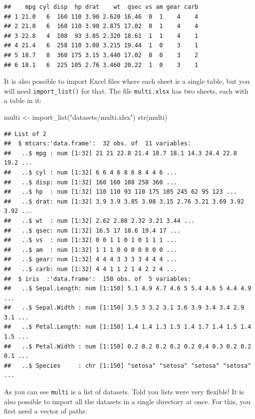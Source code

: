 \documentclass[
]{article}
\newenvironment{Shaded}{\begin{snugshade}}{\end{snugshade}}
\newcommand{\FunctionTok}[1]{\textcolor[rgb]{0.00,0.00,0.00}{#1}}
\newcommand{\NormalTok}[1]{#1}
\newcommand{\OtherTok}[1]{\textcolor[rgb]{0.56,0.35,0.01}{#1}}
\newcommand{\StringTok}[1]{\textcolor[rgb]{0.31,0.60,0.02}{#1}}
\begin{document}
\begin{verbatim}
##    mpg cyl disp  hp drat    wt  qsec vs am gear carb
## 1 21.0   6  160 110 3.90 2.620 16.46  0  1    4    4
## 2 21.0   6  160 110 3.90 2.875 17.02  0  1    4    4
## 3 22.8   4  108  93 3.85 2.320 18.61  1  1    4    1
## 4 21.4   6  258 110 3.08 3.215 19.44  1  0    3    1
## 5 18.7   8  360 175 3.15 3.440 17.02  0  0    3    2
## 6 18.1   6  225 105 2.76 3.460 20.22  1  0    3    1
\end{verbatim}

It is also possible to import Excel files where each sheet is a single table, but you will need
\texttt{import\_list()} for that. The file \texttt{multi.xlsx} has two sheets, each with a table in it:

\begin{Shaded}
\begin{Highlighting}[]
\NormalTok{multi }\OtherTok{\textless{}{-}} \FunctionTok{import\_list}\NormalTok{(}\StringTok{"datasets/multi.xlsx"}\NormalTok{)}
\FunctionTok{str}\NormalTok{(multi)}
\end{Highlighting}
\end{Shaded}

\begin{verbatim}
## List of 2
##  $ mtcars:'data.frame':  32 obs. of  11 variables:
##   ..$ mpg : num [1:32] 21 21 22.8 21.4 18.7 18.1 14.3 24.4 22.8 19.2 ...
##   ..$ cyl : num [1:32] 6 6 4 6 8 6 8 4 4 6 ...
##   ..$ disp: num [1:32] 160 160 108 258 360 ...
##   ..$ hp  : num [1:32] 110 110 93 110 175 105 245 62 95 123 ...
##   ..$ drat: num [1:32] 3.9 3.9 3.85 3.08 3.15 2.76 3.21 3.69 3.92 3.92 ...
##   ..$ wt  : num [1:32] 2.62 2.88 2.32 3.21 3.44 ...
##   ..$ qsec: num [1:32] 16.5 17 18.6 19.4 17 ...
##   ..$ vs  : num [1:32] 0 0 1 1 0 1 0 1 1 1 ...
##   ..$ am  : num [1:32] 1 1 1 0 0 0 0 0 0 0 ...
##   ..$ gear: num [1:32] 4 4 4 3 3 3 3 4 4 4 ...
##   ..$ carb: num [1:32] 4 4 1 1 2 1 4 2 2 4 ...
##  $ iris  :'data.frame':  150 obs. of  5 variables:
##   ..$ Sepal.Length: num [1:150] 5.1 4.9 4.7 4.6 5 5.4 4.6 5 4.4 4.9 ...
##   ..$ Sepal.Width : num [1:150] 3.5 3 3.2 3.1 3.6 3.9 3.4 3.4 2.9 3.1 ...
##   ..$ Petal.Length: num [1:150] 1.4 1.4 1.3 1.5 1.4 1.7 1.4 1.5 1.4 1.5 ...
##   ..$ Petal.Width : num [1:150] 0.2 0.2 0.2 0.2 0.2 0.4 0.3 0.2 0.2 0.1 ...
##   ..$ Species     : chr [1:150] "setosa" "setosa" "setosa" "setosa" ...
\end{verbatim}

As you can see \texttt{multi} is a list of datasets. Told you lists were very flexible! It is also possible
to import all the datasets in a single directory at once. For this, you first need a vector of paths:
\end{document}
